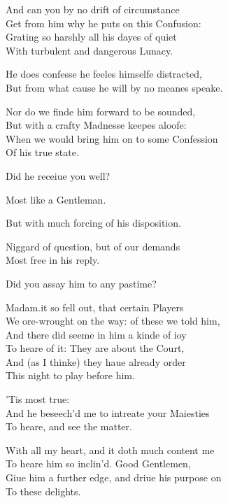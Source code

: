 \documentclass[a5paper,DIV=calc,11pt]{scrbook}
\newcommand{\updatemarks}{\markboth{Act \Roman{act}}{Scene \Roman{act}--\Roman{scene}}}
\begin{document}
\updatemarks


\begin{drama*}
    \kingspeaks And can you by no drift of circumstance\\
    Get from him why he puts on this Confusion:\\
    Grating so harshly all his dayes of quiet\\
    With turbulent and dangerous Lunacy.
    
    \rosinspeaks He does confesse he feeles himselfe distracted,\\
    But from what cause he will by no meanes speake.
    
    \guilspeaks Nor do we finde him forward to be sounded,\\
    But with a crafty Madnesse keepes aloofe:\\
    When we would bring him on to some Confession\\
    Of his true state.
    
    \queenspeaks Did he receiue you well?
    
    \rosinspeaks Most like a Gentleman.
    
    \guilspeaks But with much forcing of his disposition.
    
    \rosinspeaks Niggard of question, but of our demands\\
    Most free in his reply.
    
    \queenspeaks Did you assay him to any pastime?
    
    \rosinspeaks Madam.it so fell out, that certain Players\\
    We ore-wrought on the way: of these we told him,\\
    And there did seeme in him a kinde of ioy\\
    To heare of it: They are about the Court,\\
    And (as I thinke) they haue already order\\
    This night to play before him.
    
    \polspeaks 'Tis most true:\\
    And he beseech'd me to intreate your Maiesties\\
    To heare, and see the matter.
    
    \kingspeaks With all my heart, and it doth much content me\\
    To heare him so inclin'd. Good Gentlemen,\\
    Giue him a further edge, and driue his purpose on\\
    To these delights.
    

\end{drama*}
\end{document}
